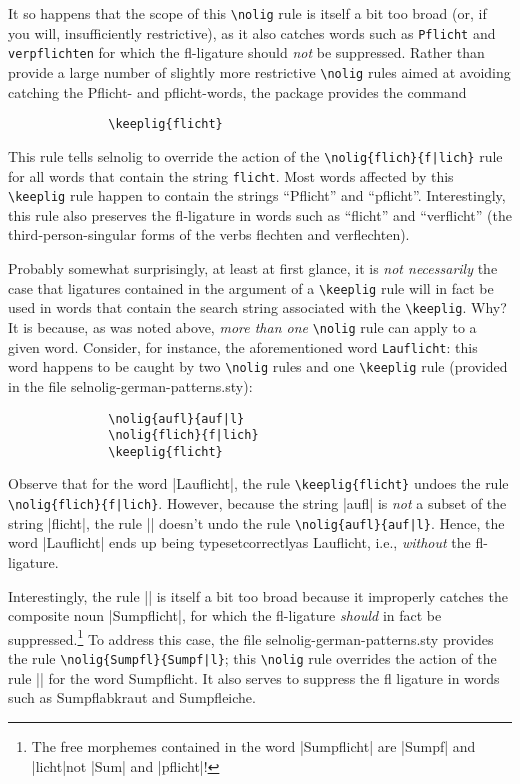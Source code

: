 \documentclass[11pt]{article}
\newcommand{\pkg}[1]{\textsf{#1}}
\newcommand{\opt}[1]{\texttt{#1}}
\newcommand{\cmmd}[1]{\texttt{\textbackslash #1}}
\begin{document}
It so happens that the scope of this \cmmd{nolig} rule is itself a bit too broad (or, if you will, insufficiently restrictive), as it also catches words such as \opt{Pflicht} and \opt{verpflichten} for which the fl-ligature should \emph{not} be suppressed. Rather than provide a large number of slightly more restrictive \cmmd{nolig} rules aimed at avoiding catching the Pflicht- and pflicht-words, the package provides the command
\begin{Verbatim}
              \keeplig{flicht}
\end{Verbatim}
This rule tells \pkg{selnolig} to override the action of the \Verb+\nolig{flich}{f|lich}+ rule for all words that contain the string \opt{flicht}. Most words affected by this \cmmd{keeplig} rule happen to contain the strings \enquote{Pflicht} and \enquote{pflicht}. Interestingly, this rule also preserves the fl-ligature in words such as \enquote{flicht} and \enquote{verflicht} (the third-person-singular forms of the verbs flechten and verflechten). 

Probably somewhat surprisingly, at least at first glance, it is \emph{not necessarily} the case that ligatures contained in the argument of a \cmmd{keeplig} rule will in fact be used in words that contain the search string associated with the \cmmd{keeplig}. Why? It is because, as was noted above, \emph{more than one} \cmmd{nolig} rule can apply to a given word. Consider, for instance, the aforementioned word \opt{Lauflicht}: this word happens to be caught by two \cmmd{nolig} rules and one \cmmd{keeplig} rule (provided in the file \pkg{selnolig-german-patterns.sty}):
\begin{Verbatim}
              \nolig{aufl}{auf|l}
              \nolig{flich}{f|lich}
              \keeplig{flicht}
\end{Verbatim}
Observe that for the word |Lauflicht|, the rule \Verb+\keeplig{flicht}+ undoes the rule \Verb+\nolig{flich}{f|lich}+. However, because the string |aufl| is \emph{not} a subset of the string |flicht|, the rule || doesn't undo the rule \Verb+\nolig{aufl}{auf|l}+. Hence, the word |Lauflicht| ends up being typeset\textemdash correctly\textemdash as Lauflicht, i.e., \emph{without} the fl-ligature. 

Interestingly, the rule || is itself a bit too broad because it improperly catches the composite noun |Sumpflicht|, for which the fl-ligature \emph{should} in fact be suppressed.\footnote{The free morphemes contained in the word |Sumpflicht| are |Sumpf| and |licht|\textemdash not |Sum| and |pflicht|!} To address this case, the file \pkg{selnolig-german-patterns.sty} provides the rule \Verb+\nolig{Sumpfl}{Sumpf|l}+; this \cmmd{nolig} rule overrides the action of the rule || for the word Sumpflicht. It also serves to suppress the fl ligature in words such as Sumpflabkraut and Sumpfleiche.
\end{document}
